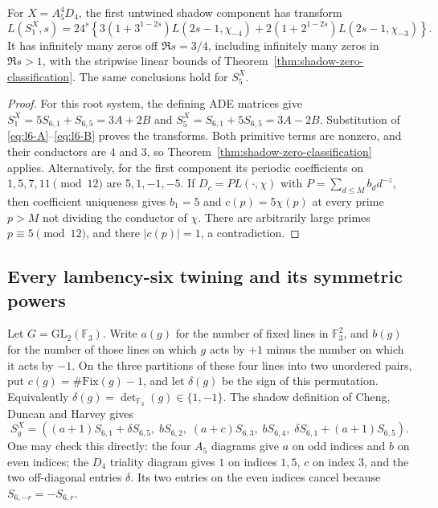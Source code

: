 \begin{theorem}\label{thm:l6-mixed-zeros}
For $X=A_5^4D_4$, the first untwined shadow component has transform
\begin{equation}\label{eq:l6-mixed-L}
 L(S^X_1,s)=24^s\left\{
 3(1+3^{1-2s})L(2s-1,\chi_{-4})+
 2(1+2^{1-2s})L(2s-1,\chi_{-3})\right\}.
\end{equation}
It has infinitely many zeros off $\Re s=3/4$, including infinitely many
zeros in $\Re s>1$, with the stripwise linear bounds of
Theorem~\ref{thm:shadow-zero-classification}.
The same conclusions hold for $S^X_5$.
\end{theorem}
\begin{proof}
For this root system, the defining ADE matrices give
$S^X_1=5S_{6,1}+S_{6,5}=3A+2B$ and
$S^X_5=S_{6,1}+5S_{6,5}=3A-2B$.
Substitution of \eqref{eq:l6-A}--\eqref{eq:l6-B} proves the transforms.
Both primitive terms are nonzero, and their conductors are $4$ and $3$,
so Theorem~\ref{thm:shadow-zero-classification} applies.
Alternatively, for the first component its periodic coefficients on
$1,5,7,11\pmod{12}$ are $5,1,-1,-5$.
If $D_c=P L(\cdot,\chi)$ with $P=\sum_{d\leq M}b_dd^{-z}$, then coefficient
uniqueness gives $b_1=5$ and $c(p)=5\chi(p)$ at every prime $p>M$ not dividing
the conductor of $\chi$.  There are arbitrarily large primes
$p\equiv5\pmod{12}$, and there $|c(p)|=1$, a contradiction.
\end{proof}

\subsection{Every lambency-six twining and its symmetric powers}
Let $G=\mathrm{GL}_2(\mathbb F_3)$.  Write $a(g)$ for the number of fixed
lines in $\mathbb F_3^2$, and $b(g)$ for the number of those lines on which
$g$ acts by $+1$ minus the number on which it acts by $-1$.  On the three
partitions of these four lines into two unordered pairs, put
$c(g)=\#\mathrm{Fix}(g)-1$, and let $\delta(g)$ be the sign of this
permutation.  Equivalently $\delta(g)=\det_{\mathbb F_3}(g)\in\{1,-1\}$.
The shadow definition of Cheng, Duncan and Harvey
\cite[Sect.~5.1, equations (5.1)--(5.6), and Table~28, p.~95]{CDH2014} gives
\begin{equation}\label{eq:l6-full-shadow}
 S^X_g=
 \left( (a+1)S_{6,1}+\delta S_{6,5},\;
 bS_{6,2},\;(a+c)S_{6,3},\;bS_{6,4},\;
 \delta S_{6,1}+(a+1)S_{6,5}\right).
\end{equation}
One may check this directly: the four $A_5$ diagrams give $a$ on odd
indices and $b$ on even indices; the $D_4$ triality diagram gives $1$ on
indices $1,5$, $c$ on index $3$, and the two off-diagonal entries
$\delta$.  Its two entries on the even indices cancel because
$S_{6,-r}=-S_{6,r}$.

